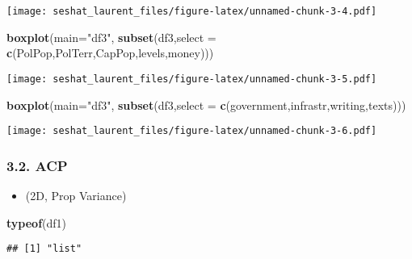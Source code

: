 \documentclass[
]{article}
\newenvironment{Shaded}{\begin{snugshade}}{\end{snugshade}}
\newcommand{\DataTypeTok}[1]{\textcolor[rgb]{0.13,0.29,0.53}{#1}}
\newcommand{\KeywordTok}[1]{\textcolor[rgb]{0.13,0.29,0.53}{\textbf{#1}}}
\newcommand{\NormalTok}[1]{#1}
\newcommand{\StringTok}[1]{\textcolor[rgb]{0.31,0.60,0.02}{#1}}
\providecommand{\tightlist}{%
  \setlength{\itemsep}{0pt}\setlength{\parskip}{0pt}}
\begin{document}
\texttt{[image: seshat\_laurent\_files/figure-latex/unnamed-chunk-3-4.pdf]}

\begin{Shaded}
\begin{Highlighting}[]
\KeywordTok{boxplot}\NormalTok{(}\DataTypeTok{main=}\StringTok{"df3"}\NormalTok{, }\KeywordTok{subset}\NormalTok{(df3,}\DataTypeTok{select =} \KeywordTok{c}\NormalTok{(PolPop,PolTerr,CapPop,levels,money)))}
\end{Highlighting}
\end{Shaded}

\texttt{[image: seshat\_laurent\_files/figure-latex/unnamed-chunk-3-5.pdf]}

\begin{Shaded}
\begin{Highlighting}[]
\KeywordTok{boxplot}\NormalTok{(}\DataTypeTok{main=}\StringTok{"df3"}\NormalTok{, }\KeywordTok{subset}\NormalTok{(df3,}\DataTypeTok{select =} \KeywordTok{c}\NormalTok{(government,infrastr,writing,texts)))}
\end{Highlighting}
\end{Shaded}

\texttt{[image: seshat\_laurent\_files/figure-latex/unnamed-chunk-3-6.pdf]}

\hypertarget{acp}{%
\subsubsection{3.2. ACP}\label{acp}}

\begin{itemize}
\tightlist
\item
  (2D, Prop Variance)
\end{itemize}

\begin{Shaded}
\begin{Highlighting}[]
\KeywordTok{typeof}\NormalTok{(df1)}
\end{Highlighting}
\end{Shaded}

\begin{verbatim}
## [1] "list"
\end{verbatim}
\end{document}
